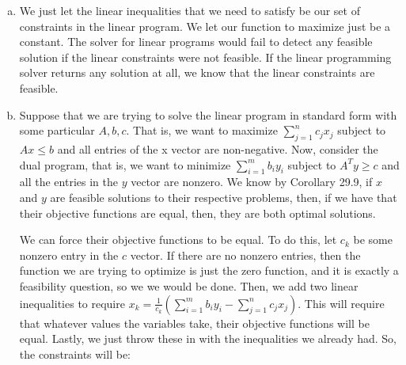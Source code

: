 \documentclass{article}
\begin{document}
\begin{enumerate}[a.]
\item
We just let the linear inequalities that we need to satisfy be our set of constraints in the linear program. We let our function to maximize just be a constant. The solver for linear programs would fail to detect any feasible solution if the linear constraints were not feasible. If the linear programming solver returns any solution at all, we know that the linear constraints are feasible. 
\item
\begin{comment}
Take the constraints of the linear program together with the constraints of its dual. Together, if these constraints are satisfied, then there must be an optimal solution which is equal to any solution of all the constraints. This approach assumes that the linear feasibility tester doesn't just say whether or not the linear inequalities are all simultaneously satisfiable, but actually gives an assignment to the variables that satisfies them. We can see that if we can get all of these inequalities simultaneously satisfied, then we must have that our solution is optimal by the duality theorem, which says that the optimal solution to the linear program is also an optimal solution to the dual of the linear program.
\end{comment}
Suppose that we are trying to solve the linear program in standard form with some particular $A,b,c$. That is, we want to maximize $\sum_{j=1}^n c_j x_j$ subject to $Ax \le b$ and all entries of the x vector are non-negative. Now, consider the dual program, that is, we want to minimize $\sum_{i=1}^m b_i y_i$ subject to $A^T y \ge c$ and all the entries in the $y$ vector are nonzero. We know by Corollary 29.9, if $x$ and $y$ are feasible solutions to their respective problems, then, if we have that their objective functions are equal, then, they are both optimal solutions. 

We can force their objective functions to be equal. To do this, let $c_k$ be some nonzero entry in the $c$ vector. If there are no nonzero entries, then the function we are trying to optimize is just the zero function, and it is exactly a feasibility question, so we we would be done. Then, we add two linear inequalities to require $x_k = \frac{1}{c_k} \left(\sum_{i=1}^m b_i y_i - \sum_{j=1}^n c_j x_j\right)$. This will require that whatever values the variables take, their objective functions will be equal. Lastly, we just throw these in with the inequalities we already had. So, the constraints will be:



\end{enumerate}
\end{document}
